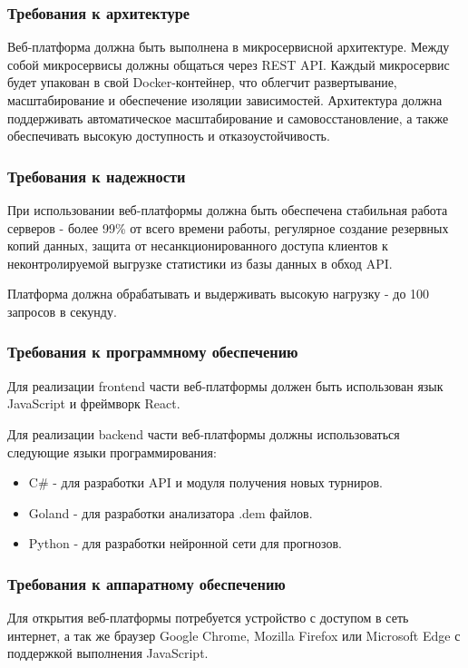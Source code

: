 \subsubsection{Требования к архитектуре}
Веб-платформа должна быть выполнена в микросервисной архитектуре. Между собой микросервисы должны общаться через REST API. Каждый микросервис будет упакован в свой Docker-контейнер, что облегчит развертывание, масштабирование и обеспечение изоляции зависимостей. Архитектура должна поддерживать автоматическое масштабирование и самовосстановление, а также обеспечивать высокую доступность и отказоустойчивость.

\subsubsection{Требования к надежности}

При использовании веб-платформы должна быть обеспечена стабильная работа серверов - более 99\% от всего времени работы, регулярное создание резервных копий данных, защита от несанкционированного доступа клиентов к неконтролируемой выгрузке статистики из базы данных в обход API.

Платформа должна обрабатывать и выдерживать высокую нагрузку - до 100 запросов в секунду.

\subsubsection{Требования к программному обеспечению}

Для реализации frontend части веб-платформы должен быть использован язык JavaScript и фреймворк React. 

Для реализации backend части веб-платформы должны использоваться следующие языки программирования: 
\begin{itemize}
	\item C\# - для разработки API и модуля получения новых турниров.
	\item Goland - для разработки анализатора .dem файлов.
	\item Python - для разработки нейронной сети для прогнозов.
\end{itemize}

\subsubsection{Требования к аппаратному обеспечению}

Для открытия веб-платформы потребуется устройство с доступом в сеть интернет, а так же браузер Google Chrome, Mozilla Firefox или Microsoft Edge с поддержкой выполнения JavaScript.


